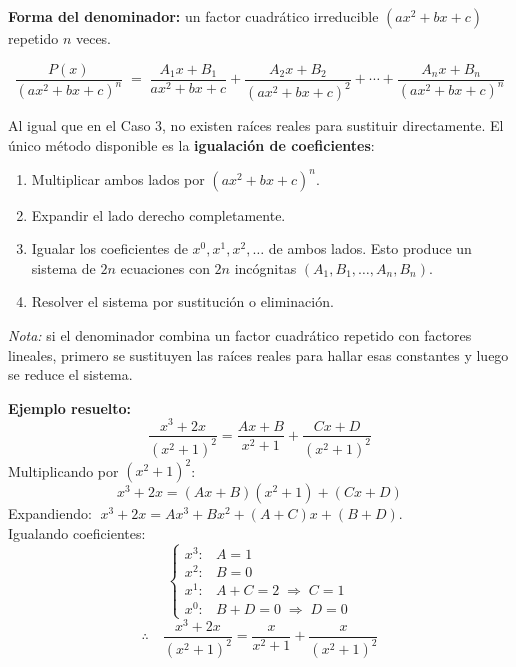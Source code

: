 \documentclass[12pt, letterpaper]{article}
\newenvironment{caso4}{%
  \begin{tcolorbox}[casobase, colframe=rosa, colbacktitle=rosaclaro, coltitle=rosatitulo,
    title=Caso 4 \textnormal{---} Factores cuadr\'{a}ticos irreducibles repetidos]
}{\end{tcolorbox}}
\newenvironment{metodocuadro}[1]{%
  \begin{tcolorbox}[subcuadro, colback=coralclaro, colframe=coral,
    coltitle=coraltitulo, colbacktitle=coralclaro,
    title={#1}]
}{\end{tcolorbox}}
\begin{document}
\vspace{0.4cm}

\begin{caso4}

\textbf{Forma del denominador:} un factor cuadr\'{a}tico irreducible $(ax^2+bx+c)$ repetido $n$ veces.

\[
  \frac{P(x)}{(ax^2+bx+c)^n}
  \;=\; \frac{A_1 x+B_1}{ax^2+bx+c} + \frac{A_2 x+B_2}{(ax^2+bx+c)^2}
        + \cdots + \frac{A_n x+B_n}{(ax^2+bx+c)^n}
\]

\begin{metodocuadro}{C\'{o}mo hallar las constantes --- Caso 4}
Al igual que en el Caso 3, no existen ra\'{i}ces reales para sustituir directamente.
El \'{u}nico m\'{e}todo disponible es la \textbf{igualaci\'{o}n de coeficientes}:

\begin{enumerate}[leftmargin=2em, label=\arabic*.]
  \item Multiplicar ambos lados por $(ax^2+bx+c)^n$.
  \item Expandir el lado derecho completamente.
  \item Igualar los coeficientes de $x^0, x^1, x^2, \ldots$ de ambos lados.
        Esto produce un sistema de $2n$ ecuaciones con $2n$ inc\'{o}gnitas
        $(A_1, B_1, \ldots, A_n, B_n)$.
  \item Resolver el sistema por sustituci\'{o}n o eliminaci\'{o}n.
\end{enumerate}

\textit{Nota:} si el denominador combina un factor cuadr\'{a}tico repetido con factores lineales,
primero se sustituyen las ra\'{i}ces reales para hallar esas constantes y luego se reduce el sistema.
\end{metodocuadro}

\medskip
\textbf{Ejemplo resuelto:}
\[
  \frac{x^3+2x}{(x^2+1)^2} = \frac{Ax+B}{x^2+1} + \frac{Cx+D}{(x^2+1)^2}
\]
Multiplicando por $(x^2+1)^2$:
\[
  x^3+2x = (Ax+B)(x^2+1) + (Cx+D)
\]
Expandiendo: $\;x^3+2x = Ax^3 + Bx^2 + (A+C)x + (B+D)$.\\[4pt]
Igualando coeficientes:
\[
  \begin{cases}
    x^3\!\!: & A = 1 \\
    x^2\!\!: & B = 0 \\
    x^1\!\!: & A + C = 2 \;\Rightarrow\; C = 1 \\
    x^0\!\!: & B + D = 0 \;\Rightarrow\; D = 0
  \end{cases}
\]
\[
  \therefore\quad \frac{x^3+2x}{(x^2+1)^2} = \frac{x}{x^2+1} + \frac{x}{(x^2+1)^2}
\]

\end{caso4}
\end{document}
